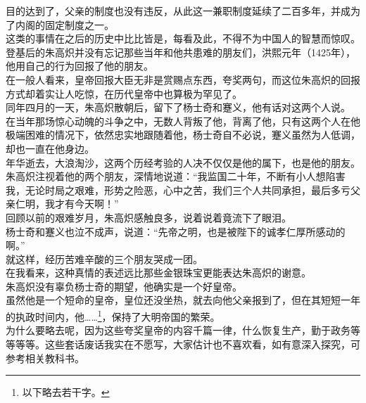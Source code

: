 \begin{multicols}{\theparacolNo}
目的达到了，父亲的制度也没有违反，从此这一兼职制度延续了二百多年，并成为了内阁的固定制度之一。\\

这类的事情在之后的历史中比比皆是，每看及此，不得不为中国人的智慧而惊叹。\\

登基后的朱高炽并没有忘记那些当年和他共患难的朋友们，洪熙元年（1425年），他用自己的行为回报了他的朋友。\\

在一般人看来，皇帝回报大臣无非是赏赐点东西，夸奖两句，而这位朱高炽的回报方式却着实让人吃惊，在历代皇帝中也算极为罕见了。\\

同年四月的一天，朱高炽散朝后，留下了杨士奇和蹇义，他有话对这两个人说。\\

在当年那场惊心动魄的斗争之中，无数人背叛了他，背离了他，只有这两个人在他极端困难的情况下，依然忠实地跟随着他，杨士奇自不必说，蹇义虽然为人低调，却也一直在他身边。\\

年华逝去，大浪淘沙，这两个历经考验的人决不仅仅是他的属下，也是他的朋友。\\

朱高炽注视着他的两个朋友，深情地说道：“我监国二十年，不断有小人想陷害我，无论时局之艰难，形势之险恶，心中之苦，我们三个人共同承担，最后多亏父亲仁明，我才有今天啊！”\\

回顾以前的艰难岁月，朱高炽感触良多，说着说着竟流下了眼泪。\\

杨士奇和蹇义也泣不成声，说道：“先帝之明，也是被陛下的诚孝仁厚所感动的啊。”\\

就这样，经历苦难辛酸的三个朋友哭成一团。\\

在我看来，这种真情的表述远比那些金银珠宝更能表达朱高炽的谢意。\\

朱高炽没有辜负杨士奇的期望，他确实是一个好皇帝。\\

虽然他是一个短命的皇帝，皇位还没坐热，就去向他父亲报到了，但在其短短一年的执政时间内，他……\footnote{以下略去若干字。}，保持了大明帝国的繁荣。\\

为什么要略去呢，因为这些夸奖皇帝的内容千篇一律，什么恢复生产，勤于政务等等等等。这些套话废话我实在不愿写，大家估计也不喜欢看，如有意深入探究，可参考相关教科书。\\


\end{multicols}
